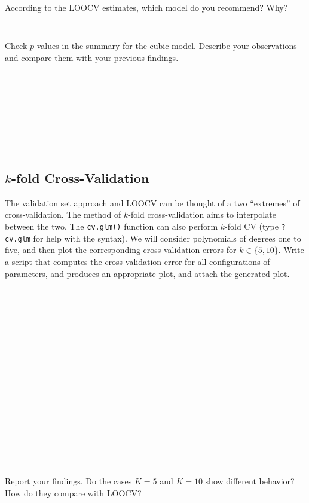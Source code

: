 \documentclass{article}
\begin{document}
According to the LOOCV estimates, which model do you recommend? Why?
\begin{Verbatim}[frame=single]


\end{Verbatim}

Check $ p $-values in the summary for the cubic model. Describe your observations and compare them with your previous findings.

\begin{Verbatim}[frame=single]









\end{Verbatim}

\subsection*{$ k $-fold Cross-Validation}
The validation set approach and LOOCV can be thought of a two ``extremes'' of
cross-validation. The method of $k$-fold cross-validation aims to interpolate
between the two. The \texttt{cv.glm()} function can also perform $k$-fold CV
(type \texttt{?cv.glm} for help with the syntax).
We will consider polynomials of degrees one to five, and then plot the
corresponding cross-validation errors for $k \in \{5, 10\}$. Write a script that
computes the cross-validation error for all configurations of parameters, and
produces an appropriate plot, and attach the generated plot.


\begin{Verbatim}[frame=single]



















\end{Verbatim}


Report your findings. Do the cases $K = 5$ and $K = 10$ show different behavior?
How do they compare with LOOCV?

\begin{Verbatim}[frame=single]








\end{Verbatim}
\end{document}

